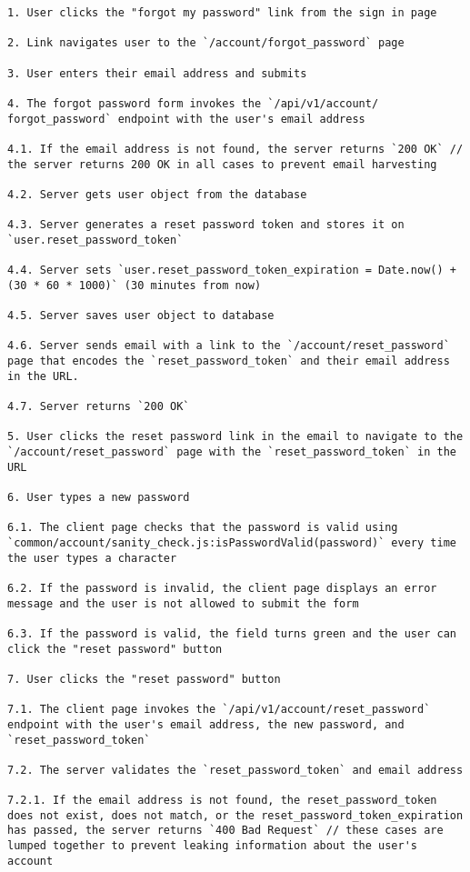 \begin{verbatim}
1. User clicks the "forgot my password" link from the sign in page

2. Link navigates user to the `/account/forgot_password` page

3. User enters their email address and submits

4. The forgot password form invokes the `/api/v1/account/ forgot_password` endpoint with the user's email address

4.1. If the email address is not found, the server returns `200 OK` // the server returns 200 OK in all cases to prevent email harvesting

4.2. Server gets user object from the database

4.3. Server generates a reset password token and stores it on `user.reset_password_token`

4.4. Server sets `user.reset_password_token_expiration = Date.now() + (30 * 60 * 1000)` (30 minutes from now)

4.5. Server saves user object to database

4.6. Server sends email with a link to the `/account/reset_password` page that encodes the `reset_password_token` and their email address in the URL.

4.7. Server returns `200 OK`

5. User clicks the reset password link in the email to navigate to the `/account/reset_password` page with the `reset_password_token` in the URL

6. User types a new password

6.1. The client page checks that the password is valid using `common/account/sanity_check.js:isPasswordValid(password)` every time the user types a character

6.2. If the password is invalid, the client page displays an error message and the user is not allowed to submit the form

6.3. If the password is valid, the field turns green and the user can click the "reset password" button

7. User clicks the "reset password" button

7.1. The client page invokes the `/api/v1/account/reset_password` endpoint with the user's email address, the new password, and `reset_password_token`

7.2. The server validates the `reset_password_token` and email address

7.2.1. If the email address is not found, the reset_password_token does not exist, does not match, or the reset_password_token_expiration has passed, the server returns `400 Bad Request` // these cases are lumped together to prevent leaking information about the user's account


\end{verbatim}
